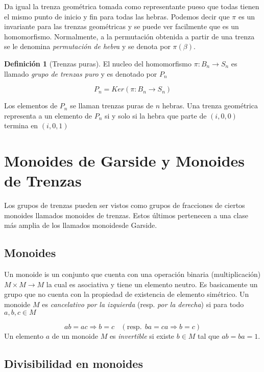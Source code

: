 \documentclass[12pt]{article}
\theoremstyle{definition}
\newtheorem{defi}{Definición}[section]
\begin{document}
Da igual la trenza geométrica tomada como representante pueso que todas tienen el mismo punto de inicio y fin para todas las hebras. Podemos decir que $\pi$ es un invariante para las trenzas geométricas y se puede ver facilmente que es un homomorfismo. Normalmente, a la permutación obtenida a partir de una trenza se le denomina \textit{permutación de hebra} y se denota por $\pi(\beta)$.

\begin{defi}[Trenzas puras]
El nucleo del homomorfismo $\pi:B_n\rightarrow S_n$ es llamado \textit{grupo de trenzas puro} y es denotado por $P_n$

$$P_n = Ker(\pi:B_n\rightarrow S_n)$$

Los elementos de $P_n$ se llaman trenzas puras de $n$ hebras. Una trenza geométrica representa a un elemento de $P_n$ si y solo si la hebra que parte de $(i,0,0)$ termina en $(i,0,1)$ 

\end{defi}


\section{Monoides de Garside y Monoides de Trenzas}
Los grupos de trenzas pueden ser vistos como grupos de fracciones de ciertos monoides llamados monoides de trenzas. Estos últimos pertenecen a una clase más amplia de los llamados monoidesde Garside.

\subsection{Monoides}

Un monoide is un conjunto que cuenta con una operación binaria (multiplicación) $M\times M \rightarrow M$ la cual es asociativa y tiene un elemento neutro. Es basicamente un grupo que no cuenta con la propiedad de existencia de elemento simétrico.
\newline
\newline
Un monoide $M$ es \textit{cancelativo por la izquierda} (resp. \textit{por la derecha}) si para todo $a,b,c\in M$

$$ab=ac\Longrightarrow b=c\ \ \ \ (\textrm{resp.}\ \  ba=ca\Longrightarrow b=c)$$
\newline
Un elemento $a$ de un monoide $M$ es \textit{invertible} si existe $b\in M$ tal que $ab=ba=1$.

\subsection{Divisibilidad en monoides}
\end{document}
